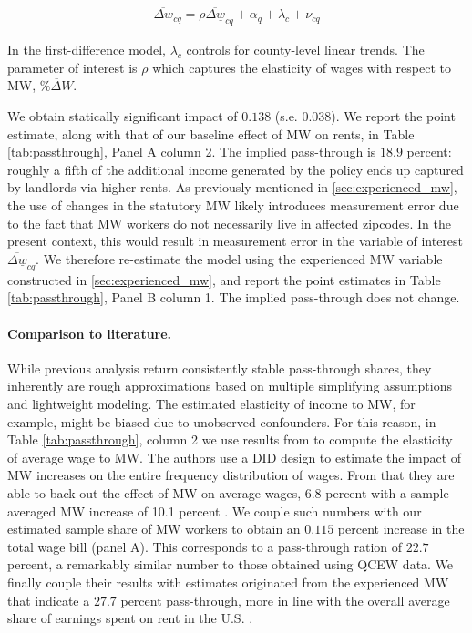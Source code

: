 \begin{align}
	\overline{\Delta w}_{cq} = \rho \overline{\Delta \underline{w}}_{cq} + \alpha_{q} + \lambda_{c} + \nu_{cq}
\end{align}

In the first-difference model, $\lambda_{c}$ controls for county-level linear trends. 
The parameter of interest is $\rho$ which captures the elasticity of wages with respect to 
MW, $\overline{\% \Delta W}$. 

We obtain statically significant impact of $0.138$ (s.e. $0.038$). 
We report the point estimate, along with that of our baseline effect of MW on rents, in 
Table \ref{tab:passthrough}, Panel A column 2. The implied pass-through is $18.9$ percent: 
roughly a fifth of the additional income generated by the policy ends up captured by landlords 
via higher rents. As previously mentioned in \autoref{sec:experienced_mw}, the use of changes in the statutory 
MW likely introduces measurement error due to the fact that MW workers do not necessarily 
live in affected zipcodes. In the present context, this would result in measurement error in 
the variable of interest $\overline{\Delta \underline{w}}_{cq}$. We therefore re-estimate the model 
using the experienced MW variable constructed in \autoref{sec:experienced_mw}, and report the point 
estimates in Table \ref{tab:passthrough}, Panel B column 1. The implied pass-through does not
change. \\

\paragraph{Comparison to literature.} While previous analysis return consistently stable 
pass-through shares, they inherently are rough approximations based on multiple simplifying 
assumptions and lightweight modeling. The estimated elasticity of income to MW, for example, 
might be biased due to unobserved confounders. For this reason, in Table \ref{tab:passthrough}, 
column 2 we use results from \textcite{CegnizEtAl2019} to compute the elasticity of 
average wage to MW. The authors use a DID design to estimate the impact of 
MW increases on the entire frequency distribution of wages. From that they are able to back out the effect of 
MW on average wages, 6.8 percent with a sample-averaged MW increase of 10.1 percent 
\parencite[Table I]{CegnizEtAl2019}. We couple such numbers with our estimated sample share 
of MW workers to obtain an $0.115$ percent increase in the total wage bill (panel A). This corresponds to 
a pass-through ration of $22.7$ percent, a remarkably similar number to those obtained using 
QCEW data. We finally couple their results with estimates originated from the experienced MW that
indicate a $27.7$ percent pass-through, more in line with the 
overall average share of earnings spent on rent in the U.S. \parencite{fernald2020americas}.   

